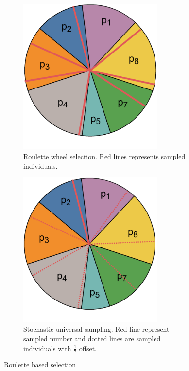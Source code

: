 \begin{figure}
    \begin{subfigure}[t]{0.47\textwidth}
        \includegraphics[width=0.8\textwidth]{img/master_roulettewheel.pdf}
        \caption{Roulette wheel selection. Red lines represents sampled individuals.}
        \label{fig:roulettewheelselection}
    \end{subfigure}
    \hfill
    \begin{subfigure}[t]{0.47\textwidth}
        \includegraphics[width=0.8\textwidth]{img/master_stochasticuniversalsampling.pdf}
        \caption{Stochastic universal sampling. Red line represent sampled number and dotted lines are sampled individuals with $\frac{1}{7}$ offset.}
        \label{fig:USB}
    \end{subfigure}
    \caption{Roulette based selection}
\end{figure}

